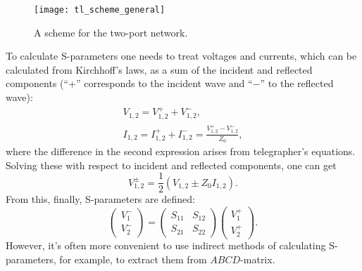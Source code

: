 \documentclass[12pt, twoside]{report}
\newcommand{\rbrkt}[1]{\left( #1 \right)}
\numberwithin{equation}{section}
\begin{document}
\begin{figure}[h]
\centering
\texttt{[image: tl\_scheme\_general]}
\caption{A scheme for the two-port network.}
\label{fgeneral2port}
\end{figure}

To calculate S-parameters one needs to treat voltages and currents, which can be calculated from Kirchhoff's laws, as a sum of the incident and reflected components (``+'' corresponds to the incident wave and ``$-$'' to the reflected wave):
\begin{gather*}
V_{1,2} = V_{1,2}^+ + V_{1,2}^- ,\\
I_{1,2} = I_{1,2}^+ + I_{1,2}^- = \frac{ V_{1,2}^+ - V_{1,2}^- }{Z_0},
\end{gather*}
where the difference in the second expression arises from telegrapher's equations. Solving these with respect to incident and reflected components, one can get
\begin{equation*}
V_{1,2}^\pm = \frac{1}{2}(V_{1,2} \pm Z_0 I_{1,2}).
\end{equation*}
From this, finally, S-parameters are defined:
\begin{equation}
\rbrkt{\begin{matrix}
V_1^- \\
V_2^-
\end{matrix}} = 
\rbrkt{\begin{matrix}
S_{11} & S_{12} \\
S_{21} & S_{22}
\end{matrix}}
\rbrkt{\begin{matrix}
V_1^+ \\
V_2^+
\end{matrix}}.
\label{eq:S_def}
\end{equation}
However, it's often more convenient to use indirect methods of calculating S-parameters, for example, to extract them from $ABCD$-matrix.
\end{document}
